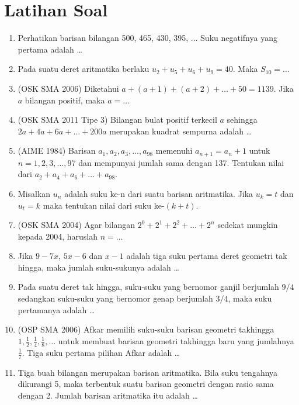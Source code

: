 \documentclass[12pt]{scrartcl}
\begin{document}
\section{Latihan Soal}
\begin{enumerate}
    \item Perhatikan barisan bilangan 500, 465, 430, 395, ... Suku negatifnya yang pertama adalah \dots
    
    \item Pada suatu deret aritmatika berlaku $u_2+u_5+u_6+u_9 = 40$. Maka $S_{10} = \dots$
    
    \item (OSK SMA 2006) Diketahui $a+(a+1)+(a+2)+\dots+50 = 1139$. Jika $a$ bilangan positif, maka $a = \dots$
    
    \item (OSK SMA 2011 Tipe 3) Bilangan bulat positif terkecil $a$ sehingga $2a+4a+6a+\dots+200a$ merupakan kuadrat sempurna adalah \dots
    
    \item (AIME 1984) Barisan $a_1, a_2, a_3, \dots, a_{98}$ memenuhi $a_{n+1} = a_n + 1$ untuk $n=1, 2, 3, \dots, 97$ dan mempunyai jumlah sama dengan 137. Tentukan nilai dari $a_2+a_4+a_6+\dots+a_{98}$.
    
    \item Misalkan $u_n$ adalah suku ke-n dari suatu barisan aritmatika. Jika $u_k = t$ dan $u_t = k$ maka tentukan nilai dari suku ke-$(k+t)$.
    
    \item (OSK SMA 2004) Agar bilangan $2^0+2^1+2^2+\dots+2^n$ sedekat mungkin kepada 2004, haruslah $n = \dots$
    
    \item Jika $9-7x$, $5x-6$ dan $x-1$ adalah tiga suku pertama deret geometri tak hingga, maka jumlah suku-sukunya adalah \dots
    
    \item Pada suatu deret tak hingga, suku-suku yang bernomor ganjil berjumlah $9/4$ sedangkan suku-suku yang bernomor genap berjumlah $3/4$, maka suku pertamanya adalah \dots
    
    \item (OSP SMA 2006) Afkar memilih suku-suku barisan geometri takhingga $1, \frac{1}{2}, \frac{1}{4}, \frac{1}{8}, \dots$ untuk membuat barisan geometri takhingga baru yang jumlahnya $\frac{1}{7}$. Tiga suku pertama pilihan Afkar adalah \dots
    
    \item Tiga buah bilangan merupakan barisan aritmatika. Bila suku tengahnya dikurangi 5, maka terbentuk suatu barisan geometri dengan rasio sama dengan 2. Jumlah barisan aritmatika itu adalah \dots
    

\end{enumerate}
\end{document}
